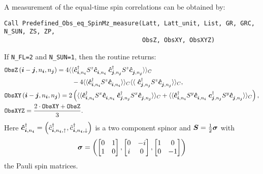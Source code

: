 A measurement of the equal-time spin correlations can be obtained by:
\begin{lstlisting}[style=fortran]
Call Predefined_Obs_eq_SpinMz_measure(Latt, Latt_unit, List, GR, GRC, N_SUN, ZS, ZP,
                                      ObsZ, ObsXY, ObsXYZ)
\end{lstlisting}
If \texttt{N\_FL=2} and \texttt{N\_SUN=1}, then the routine returns:
\begin{align}
&\texttt{ObsZ}\left(\ve{i}-\ve{j}, n_{\ve{i}},  n_{\ve{j}} \right)  =  \begin{multlined}[t]  4 \langle \langle \ve{\hat{c}}^{\dagger}_{\ve{i}, n_{\ve{i}}} S^z \ve{\hat{c}}^{\phantom\dagger}_{\ve{i}, n_{\ve{i}} }   \;  \ve{\hat{c}}^{\dagger}_{\ve{j}, n_{\ve{j}}} S^z  \ve{\hat{c}}^{\phantom\dagger}_{\ve{j}, n_{\ve{j}}}\rangle \rangle_{C} \\
-    4 \langle \langle \ve{\hat{c}}^{\dagger}_{\ve{i}, n_{\ve{i}}} S^z \ve{\hat{c}}^{\phantom\dagger}_{\ve{i}, n_{\ve{i}} } \rangle \rangle_{C}  \langle \langle \  \ve{\hat{c}}^{\dagger}_{\ve{j}, n_{\ve{j}}} S^z  \ve{\hat{c}}^{\phantom\dagger}_{\ve{j}, n_{\ve{j}}}\rangle \rangle_{C} ,  \end{multlined} \nonumber \\  
&\texttt{ObsXY}\left(\ve{i}-\ve{j}, n_{\ve{i}},  n_{\ve{j}} \right)  =  2 \left( \langle \langle \ve{\hat{c}}^{\dagger}_{\ve{i}, n_{\ve{i}}} S^x \ve{\hat{c}}^{\phantom\dagger}_{\ve{i}, n_{\ve{i}} }   \;  \ve{\hat{c}}^{\dagger}_{\ve{j}, n_{\ve{j}}} S^x  
\ve{\hat{c}}^{\phantom\dagger}_{\ve{j}, n_{\ve{j}}}\rangle \rangle_{C}  +
\langle \langle \ve{\hat{c}}^{\dagger}_{\ve{i}, n_{\ve{i}}} S^y \ve{\hat{c}}^{\phantom\dagger}_{\ve{i}, n_{\ve{i}} }   \;  \ve{c}^{\dagger}_{\ve{j}, n_{\ve{j}}} S^y  \ve{\hat{c}}^{\phantom\dagger}_{\ve{j}, n_{\ve{j}}}\rangle \rangle_{C}  \right), \nonumber \\
&\texttt{ObsXYZ} =  \frac{2\cdot\texttt{ObsXY} + \texttt{ObsZ}}{3}.
\end{align}
Here  $\boldsymbol{\hat{c}}^{\dagger}_{\boldsymbol{i}, n_{\boldsymbol{i}}} =  \left( \hat{c}^{\dagger}_{\boldsymbol{i}, n_{\boldsymbol{i}},\uparrow},  \hat{c}^{\dagger}_{\boldsymbol{i}, n_{\boldsymbol{i}},\downarrow} \right) $ is a two  component spinor  and    $ \boldsymbol{S}  = \frac{1}{2} \boldsymbol{\sigma}$  
with
\begin{equation}
\boldsymbol{\sigma}   = \left(
\begin{bmatrix} 
0 & 1 \\
1 & 0 
\end{bmatrix},
\begin{bmatrix} 
0 & -i \\
i & 0 
\end{bmatrix},
\begin{bmatrix} 
1 & 0 \\
0 & -1 
\end{bmatrix}
\right) \label{eq:vecPaulimat}
 \end{equation}
 the Pauli spin  matrices. 

